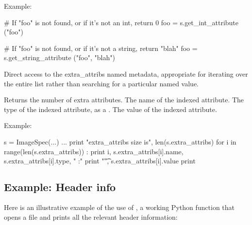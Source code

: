 \noindent Example:
\begin{code}
    # If "foo" is not found, or if it's not an int, return 0
    foo = s.get_int_attribute ("foo")

    # If "foo" is not found, or if it's not a string, return "blah"
    foo = s.get_string_attribute ("foo", "blah")
\end{code}
\apiend

Direct access to the {\cf extra_attribs} named metadata, appropriate for
iterating over the entire list rather than searching for a particular named
value.

\vspace{-10pt}
\vspace{10pt}
Returns the number of extra attributes.
\apiend
\vspace{-24pt}
\vspace{10pt}
The name of the indexed attribute.
\apiend
\vspace{-24pt}
\vspace{10pt}
The type of the indexed attribute, as a \TypeDesc.
\apiend
\vspace{-24pt}
\vspace{10pt}
The value of the indexed attribute.
\apiend

\noindent Example:
\begin{code}
    s = ImageSpec(...)
    ...
    print "extra_attribs size is", len(s.extra_attribs)
    for i in range(len(s.extra_attribs)) :
        print i, s.extra_attribs[i].name, s.extra_attribs[i].type, " :"
        print "\t", s.extra_attribs[i].value
    print
\end{code}
\apiend


\newpage
\subsection*{Example: Header info}

Here is an illustrative example of the use of \ImageSpec, a working Python
function that opens a file and prints all the relevant header
information:

